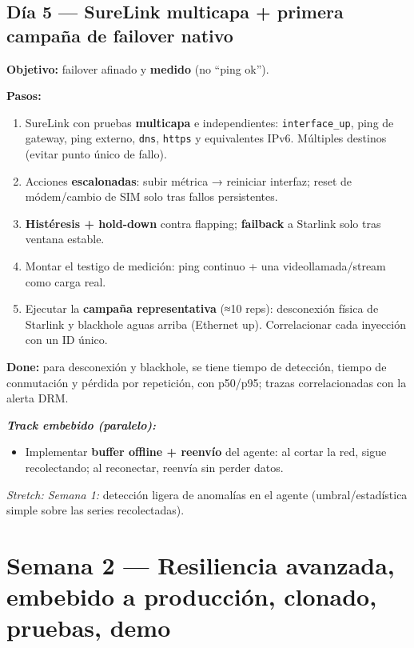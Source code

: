 \documentclass[11pt,a4paper]{article}
\newcommand{\file}[1]{\texttt{#1}}
\newcommand{\done}{\textbf{Done:}}
\newcommand{\embebido}{\textit{Track embebido (paralelo):}}
\newcommand{\stretchgoal}[1]{\textit{Stretch: #1}}
\begin{document}
\subsection{Día 5 — SureLink multicapa + primera campaña de failover nativo}

\textbf{Objetivo:} failover afinado y \textbf{medido} (no ``ping ok'').

\textbf{Pasos:}
\begin{enumerate}
  \item SureLink con pruebas \textbf{multicapa} e independientes: \file{interface\_up},
        ping de gateway, ping externo, \file{dns}, \file{https} y equivalentes IPv6.
        Múltiples destinos (evitar punto único de fallo).
  \item Acciones \textbf{escalonadas}: subir métrica → reiniciar interfaz; reset de
        módem/cambio de SIM solo tras fallos persistentes.
  \item \textbf{Histéresis + hold-down} contra flapping; \textbf{failback} a Starlink solo
        tras ventana estable.
  \item Montar el testigo de medición: ping continuo + una videollamada/stream como carga real.
  \item Ejecutar la \textbf{campaña representativa} (≈10 reps): desconexión física de Starlink
        y blackhole aguas arriba (Ethernet up). Correlacionar cada inyección con un ID único.
\end{enumerate}

\begin{clave}
\small
\done{} para desconexión y blackhole, se tiene tiempo de detección, tiempo de conmutación y
pérdida por repetición, con p50/p95; trazas correlacionadas con la alerta DRM.
\end{clave}

\textbf{\embebido}
\begin{itemize}
  \item Implementar \textbf{buffer offline + reenvío} del agente: al cortar la red, sigue
        recolectando; al reconectar, reenvía sin perder datos.
\end{itemize}

\begin{nota}
\small
\stretchgoal{Semana 1:} detección ligera de anomalías en el agente (umbral/estadística simple sobre
las series recolectadas).
\end{nota}

\section{Semana 2 — Resiliencia avanzada, embebido a producción, clonado, pruebas, demo}
\end{document}
